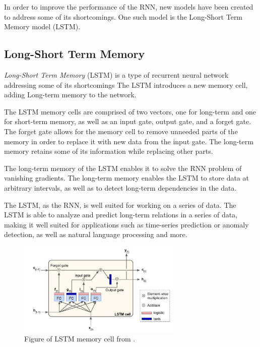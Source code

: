In order to improve the performance of the RNN, new models have been created to address some of its shortcomings.
One such model is the Long-Short Term Memory model (LSTM).


\cite[p.~469-472]{Geron2017}


\subsection{Long-Short Term Memory}
\label{section:BT:LSTM}

\textit{Long-Short Term Memory} (LSTM) is a type of recurrent neural network addressing some of its shortcomings
The LSTM introduces a new memory cell, adding Long-term memory to the network.

The LSTM memory cells are comprised of two vectors, one for long-term and one for short-term memory,
as well as an input gate, output gate, and a forget gate.
The forget gate allows for the memory cell to remove unneeded parts of the memory in order to replace it with new data from the input gate.
The long-term memory retains some of its information while replacing other parts.

The long-term memory of the LSTM enables it to solve the RNN problem of vanishing gradients.
The long-term memory enables the LSTM to store data at arbitrary intervals, as well as to detect long-term dependencies in the data.

The LSTM, as the RNN, is well suited for working on a series of data.
The LSTM is able to analyze and predict long-term relations in a series of data, making it well suited for applications such as time-series prediction or anomaly detection,
as well as natural language processing and more.

\begin{figure}[h!]
  \centering
  \includegraphics[width=0.7\textwidth]{./sections/BT/figures/lstm_cell_hands_on.png}
  \hfill
  \caption{Figure of LSTM memory cell from \cite[p.~492]{Geron2017}.}
  \label{fig:lstm-memory-cell}
\end{figure}



